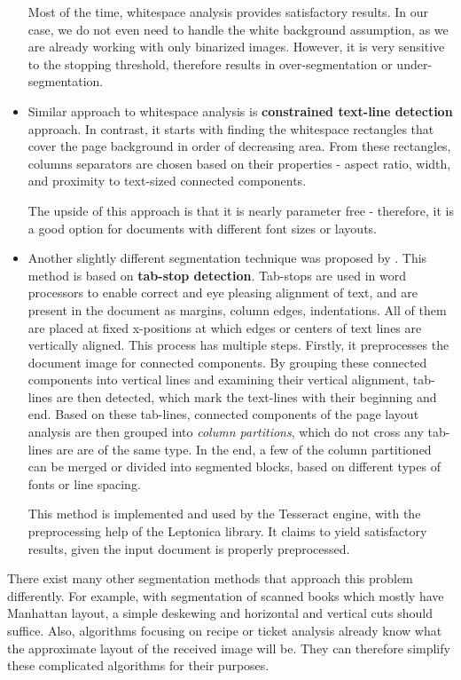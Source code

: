 \begin{itemize}
Most of the time, whitespace analysis provides satisfactory results. In our case, we do not even need to handle the white background assumption, as we are already working with only binarized images. However, it is very sensitive to the stopping threshold, therefore results in over-segmentation or under-segmentation.

\item Similar approach to whitespace analysis is \textbf{constrained text-line detection} approach. In contrast, it starts with finding the whitespace rectangles that cover the page background in order of decreasing area. From these rectangles, columns separators are chosen based on their properties - aspect ratio, width, and proximity to text-sized connected components.

The upside of this approach is that it is nearly parameter free - therefore, it is a good option for documents with different font sizes or layouts.

\item Another slightly different segmentation technique was proposed by \citet{tesseractSegmentationTab}. This method is based on \textbf{tab-stop detection}. Tab-stops are used in word processors to enable correct and eye pleasing alignment of text, and are present in the document as margins, column edges, indentations. All of them are placed at fixed x-positions at which edges or centers of text lines are vertically aligned. This process has multiple steps. Firstly, it preprocesses the document image for connected components. By grouping these connected components into vertical lines and examining their vertical alignment, tab-lines are then detected, which mark the text-lines with their beginning and end. Based on these tab-lines, connected components of the page layout analysis are then grouped into \emph{column partitions}, which do not cross any tab-lines are are of the same type. In the end, a few of the column partitioned can be merged or divided into segmented blocks, based on different types of fonts or line spacing. 

This method is implemented and used by the Tesseract engine, with the preprocessing help of the Leptonica library. It claims to yield satisfactory results, given the input document is properly preprocessed. 

\end{itemize}

There exist many other segmentation methods that approach this problem differently. For example, with segmentation of scanned books which mostly have Manhattan layout, a simple deskewing and horizontal and vertical cuts should suffice. Also, algorithms focusing on recipe or ticket analysis already know what the approximate layout of the received image will be. They can therefore simplify these complicated algorithms for their purposes.

